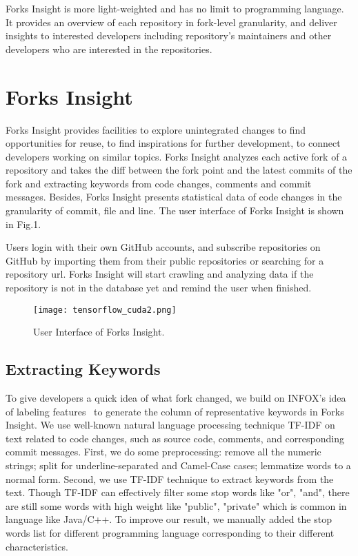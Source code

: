 Forks Insight is more light-weighted and has no limit to programming language. It provides an overview of each repository in fork-level granularity, and deliver insights to interested developers including repository's maintainers and other developers who are interested in the repositories.


\section{Forks Insight}

Forks Insight provides facilities to explore unintegrated changes to find opportunities for reuse, to find inspirations for further development, to connect developers working on similar topics.
%
Forks Insight analyzes each active fork of a repository and takes the diff between the fork point and the latest commits   of the fork and extracting keywords from code changes, comments and commit messages.
%
Besides, Forks Insight presents statistical data of code changes in the granularity of commit, file and line. The user interface of Forks Insight is shown in Fig.1. 

Users login with their own GitHub accounts, and subscribe repositories on GitHub by importing them from their public repositories or searching for a repository url. Forks Insight will start crawling and analyzing data if the repository is not in the database yet and remind the user when finished. 

\begin{figure*}[ht]
\texttt{[image: tensorflow\_cuda2.png]}
\caption{User Interface of Forks Insight.}
\vspace{-6pt}
\label{GUI}
\end{figure*}

\subsection{Extracting Keywords}
To give developers a quick idea of what fork changed, we build on INFOX's idea of labeling features~\cite{ZSLXWK:ICSE18}
to generate the column of representative keywords in Forks Insight. We use well-known natural language processing technique TF-IDF \cite{salton1988term} on text related to code changes, such as source code, comments, and corresponding commit messages. First, we do some preprocessing: remove all the numeric strings; split for underline-separated and Camel-Case cases; lemmatize words to a normal form. Second, we use TF-IDF technique to extract keywords from the text. Though TF-IDF can effectively filter some stop words like "or", "and", there are still some words with high weight like "public", "private" which is common in language like Java/C++. To improve our result, we manually added the stop words list for different programming language corresponding to their different characteristics.

